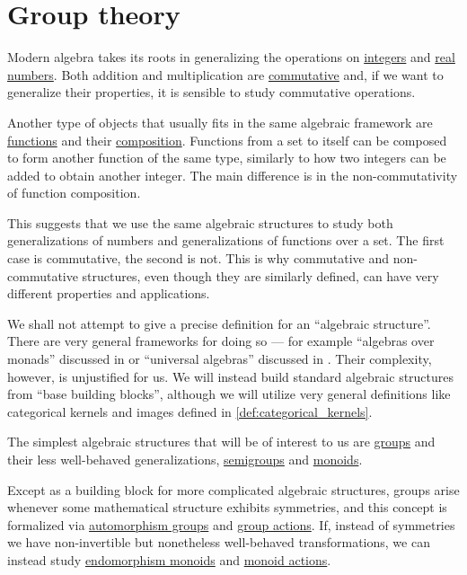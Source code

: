 \chapter{Group theory}\label{ch:group_theory}

Modern algebra takes its roots in generalizing the operations on \hyperref[def:integers]{integers} and \hyperref[def:real_numbers]{real numbers}. Both addition and multiplication are \hyperref[def:binary_operation/commutative]{commutative} and, if we want to generalize their properties, it is sensible to study commutative operations.

Another type of objects that usually fits in the same algebraic framework are \hyperref[def:function]{functions} and their \hyperref[def:set_valued_function/composition]{composition}. Functions from a set to itself can be composed to form another function of the same type, similarly to how two integers can be added to obtain another integer. The main difference is in the non-commutativity of function composition.

This suggests that we use the same algebraic structures to study both generalizations of numbers and generalizations of functions over a set. The first case is commutative, the second is not. This is why commutative and non-commutative structures, even though they are similarly defined, can have very different properties and applications.

We shall not attempt to give a precise definition for an \enquote{algebraic structure}. There are very general frameworks for doing so --- for example \enquote{algebras over monads} discussed in \cite[ch. VI]{MacLane1998CategoryTheory} or \enquote{universal algebras} discussed in \cite[\S 1.2.]{ЦаленкоШульгейфер1974ОсновыТеорииКатегорий}. Their complexity, however, is unjustified for us. We will instead build standard algebraic structures from \enquote{base building blocks}, although we will utilize very general definitions like categorical kernels and images defined in \cref{def:categorical_kernels}.

The simplest algebraic structures that will be of interest to us are \hyperref[def:group]{groups} and their less well-behaved generalizations, \hyperref[def:semigroup]{semigroups} and \hyperref[def:monoid]{monoids}.

Except as a building block for more complicated algebraic structures, groups arise whenever some mathematical structure exhibits symmetries, and this concept is formalized via \hyperref[def:automorphism_group]{automorphism groups} and \hyperref[def:group_action]{group actions}. If, instead of symmetries we have non-invertible but nonetheless well-behaved transformations, we can instead study \hyperref[def:endomorphism_monoid]{endomorphism monoids} and \hyperref[def:monoid_action]{monoid actions}.

